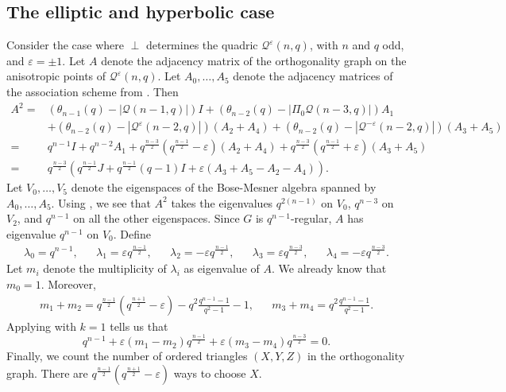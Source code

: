 \documentclass[a4paper]{article}
\theoremstyle{definition}
\newcommand{\eps}{\varepsilon}
\newcommand{\mq}{\mathcal Q}
\begin{document}
\subsection{The elliptic and hyperbolic case}

Consider the case where $\perp$ determines the quadric $\mq^\eps(n,q)$, with $n$ and $q$ odd, and $\eps = \pm 1$.
Let $A$ denote the adjacency matrix of the orthogonality graph on the anisotropic points of $\mq^\eps(n,q)$.
Let $A_0, \dots, A_5$ denote the adjacency matrices of the association scheme from .
Then
\begin{align*}
  A^2 = & \left( \theta_{n-1}(q) - \left| \mq(n-1,q) \right| \right) I
  + \left( \theta_{n-2}(q) - \left| \Pi_0 \mq(n-3,q) \right| \right) A_1 \\
  & + \left( \theta_{n-2}(q) - \left| \mq^\eps(n-2,q) \right| \right) (A_2+A_4)
  + \left( \theta_{n-2}(q) - \left| \mq^{-\eps}(n-2,q) \right| \right) (A_3+A_5) \\
  = & q^{n-1} I + q^{n-2} A_1 + q^\frac{n-3}2 \left( q^\frac{n-1}2 - \eps \right) (A_2+A_4) + q^\frac{n-3}2 \left( q^\frac{n-1}2 + \eps \right) (A_3+A_5) \\
  = & q^\frac{n-3}2 \left( q^\frac{n-1}2 J + q^\frac{n-1}2(q-1) I + \eps( A_3 + A_5 - A_2 - A_4) \right).
\end{align*}
Let $V_0, \dots, V_5$ denote the eigenspaces of the Bose-Mesner algebra spanned by $A_0, \dots, A_5$.
Using , we see that $A^2$ takes the eigenvalues $q^{2(n-1)}$ on $V_0$, $q^{n-3}$ on $V_2$, and $q^{n-1}$ on all the other eigenspaces.
Since $G$ is $q^{n-1}$-regular, $A$ has eigenvalue $q^{n-1}$ on $V_0$.
Define
\begin{align*}
 \lambda_0 = q^{n-1}, &&
 \lambda_1 = \eps q^\frac{n-1}2, &&
 \lambda_2 = -\eps q^\frac{n-1}2, &&
 \lambda_3 = \eps q^\frac{n-3}2, &&
 \lambda_4 = -\eps q^\frac{n-3}2.
\end{align*}
Let $m_i$ denote the multiplicity of $\lambda_i$ as eigenvalue of $A$.
We already know that $m_0=1$.
Moreover,
\begin{align*}
  m_1 + m_2 = q^\frac{n-1}2 \left( q^\frac{n+1}2 - \eps \right) - q^2 \frac{q^{n-1} - 1}{q^2-1} - 1, &&
  m_3 + m_4 = q^2 \frac{q^{n-1} - 1}{q^2-1}.
\end{align*}
Applying  with $k=1$ tells us that
\[
 q^{n-1} + \eps (m_1 - m_2) q^\frac{n-1}2 + \eps (m_3-m_4) q^\frac{n-3}2 = 0.
\]
Finally, we count the number of ordered triangles $(X,Y,Z)$ in the orthogonality graph.
There are $q^\frac{n-1}2 \left( q^\frac{n+1}2 - \eps \right)$ ways to choose $X$.
\end{document}
